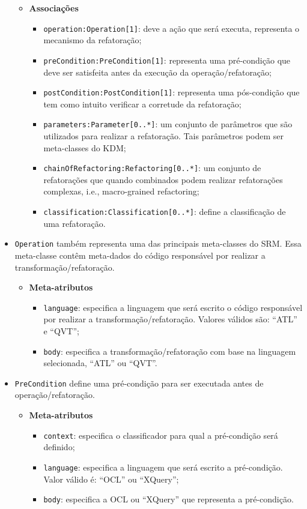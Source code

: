 \begin{itemize}
\begin{itemize}
	\item \textbf{Associações}
		\begin{itemize}
			\item \texttt{operation:Operation[1]}: deve a ação que será executa, representa o mecanismo da refatoração;
			\item \texttt{preCondition:PreCondition[1]}: representa uma pré-condição que deve ser satisfeita antes da execução da operação/refatoração;
			\item \texttt{postCondition:PostCondition[1]}: representa uma pós-condição que tem como intuito verificar a corretude da refatoração;
			\item \texttt{parameters:Parameter[0..*]}: um conjunto de parâmetros que são utilizados para realizar a refatoração. Tais parâmetros podem ser meta-classes do KDM;
			\item \texttt{chainOfRefactoring:Refactoring[0..*]}: um conjunto de refatorações que quando combinados podem realizar refatorações complexas, i.e., macro-grained refactoring;
			\item \texttt{classification:Classification[0..*]}: define a classificação de uma refatoração.
		\end{itemize}	
\end{itemize} 

\item \texttt{Operation} também representa uma das principais meta-classes do SRM. Essa meta-classe contêm meta-dados do código responsável por realizar a transformação/refatoração.

\begin{itemize}
	\item \textbf{Meta-atributos}
		\begin{itemize}
			\item \texttt{language}: especifica a linguagem que será escrito o código responsável por realizar a transformação/refatoração. Valores válidos são: ``ATL'' e ``QVT'';
			\item \texttt{body}: especifica a transformação/refatoração com base na linguagem selecionada, ``ATL'' ou ``QVT''.
		\end{itemize}	
\end{itemize} 

\item \texttt{PreCondition} define uma pré-condição para ser executada antes de operação/refatoração.

\begin{itemize}
	\item \textbf{Meta-atributos}
		\begin{itemize}
			\item \texttt{context}: especifica o classificador para qual a pré-condição será definido;
			\item \texttt{language}: especifica a linguagem que será escrito a pré-condição. Valor válido é: ``OCL'' ou ``XQuery'';
			\item \texttt{body}: especifica a OCL ou ``XQuery'' que representa a pré-condição.
		\end{itemize}	
\end{itemize} 


\end{itemize}
